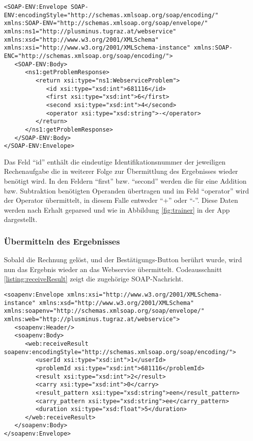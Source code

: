 \begin{lstlisting}[caption=Erhalten einer Rechenaufgabe, label=listing:getProblemAnswer]
<SOAP-ENV:Envelope SOAP-ENV:encodingStyle="http://schemas.xmlsoap.org/soap/encoding/" xmlns:SOAP-ENV="http://schemas.xmlsoap.org/soap/envelope/" xmlns:ns1="http://plusminus.tugraz.at/webservice" xmlns:xsd="http://www.w3.org/2001/XMLSchema" xmlns:xsi="http://www.w3.org/2001/XMLSchema-instance" xmlns:SOAP-ENC="http://schemas.xmlsoap.org/soap/encoding/">
   <SOAP-ENV:Body>
      <ns1:getProblemResponse>
         <return xsi:type="ns1:WebserviceProblem">
            <id xsi:type="xsd:int">681116</id>
            <first xsi:type="xsd:int">6</first>
            <second xsi:type="xsd:int">4</second>
            <operator xsi:type="xsd:string">-</operator>
         </return>
      </ns1:getProblemResponse>
   </SOAP-ENV:Body>
</SOAP-ENV:Envelope>
\end{lstlisting}

Das Feld \enquote{id} enthält die eindeutige Identifikationsnummer der jeweiligen Rechenaufgabe die 
in weiterer Folge zur Übermittlung des Ergebnisses wieder benötigt wird. In den 
Feldern \enquote{first} bzw. \enquote{second} werden die für eine Addition bzw. Subtraktion benötigten 
Operanden übertragen und im Feld \enquote{operator} wird der Operator übermittelt, in diesem Falle entweder
\enquote{+} oder \enquote{-}. Diese Daten werden nach Erhalt geparsed und wie in Abbildung \ref{fig:trainer} in der App dargestellt.

\subsubsection{Übermitteln des Ergebnisses}
Sobald die Rechnung gelöst, und der Bestätigungs-Button berührt wurde, wird nun das Ergebnis wieder an das 
Webservice übermittelt. Codeausschnitt \ref{listing:receiveResult} zeigt die zugehörige SOAP-Nachricht.
\begin{lstlisting}[caption=Übermitteln des Resultats, label=listing:receiveResult]
<soapenv:Envelope xmlns:xsi="http://www.w3.org/2001/XMLSchema-instance" xmlns:xsd="http://www.w3.org/2001/XMLSchema" xmlns:soapenv="http://schemas.xmlsoap.org/soap/envelope/" xmlns:web="http://plusminus.tugraz.at/webservice">
   <soapenv:Header/>
   <soapenv:Body>
      <web:receiveResult soapenv:encodingStyle="http://schemas.xmlsoap.org/soap/encoding/">
         <userId xsi:type="xsd:int">1</userId>
         <problemId xsi:type="xsd:int">681116</problemId>
         <result xsi:type="xsd:int">2</result>
         <carry xsi:type="xsd:int">0</carry>
         <result_pattern xsi:type="xsd:string">een</result_pattern>
         <carry_pattern xsi:type="xsd:string">ee</carry_pattern>
         <duration xsi:type="xsd:float">5</duration>
      </web:receiveResult>
   </soapenv:Body>
</soapenv:Envelope>
\end{lstlisting}

